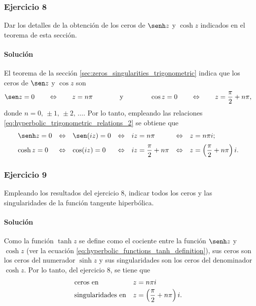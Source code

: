 \documentclass[a4paper]{report}
\begin{document}
\subsubsection{Ejercicio 8}

Dar los detalles de la obtención de los ceros de \(\senh z\) y \(\cosh z\) indicados en el teorema de esta sección.

\paragraph{Solución} El teorema de la sección \ref{sec:zeros_singularities_trigonometric} indica que los ceros de \(\sen z\) y \(\cos z\) son
\[
 \sen z=0\qquad\Leftrightarrow\qquad z=n\pi
 \qquad\qquad\textrm{y}\qquad\qquad
 \cos z=0\qquad\Leftrightarrow\qquad z=\frac{\pi}{2}+n\pi,
\]
donde \(n=0,\,\pm1,\,\pm2,\,\dots\). Por lo tanto, empleando las relaciones \ref{eq:hyperbolic_trigonometric_relations_2} se obtiene que 
\[
 \begin{array}{lllllll}
  \senh z=0 & \Leftrightarrow & \sen(iz)=0 & \Leftrightarrow & iz=n\pi & \Leftrightarrow & z=n\pi i;\\[\medskipamount]
  \cosh z=0 & \Leftrightarrow & \cos(iz)=0 & \Leftrightarrow & iz=\dfrac{\pi}{2}+n\pi & \Leftrightarrow & z=\left(\dfrac{\pi}{2}+n\pi\right)i.
 \end{array}
\]

\subsubsection{Ejercicio 9}

Empleando los resultados del ejercicio 8, indicar todos los ceros y las singularidades de la función tangente hiperbólica.

\paragraph{Solución} Como la función \(\tanh z\) se define como el cociente entre la función \(\senh z\) y \(\cosh z\) (ver la ecuación \ref{eq:hyperbolic_functions_tanh_definition}), sus ceros son los ceros del numerador \(\sinh z\) y sus singularidades son los ceros del denominador \(\cosh z\). Por lo tanto, del ejercicio 8, se tiene que
\[
 \begin{array}{ll}
  \textrm{ceros en} & z=n\pi i\\[\smallskipamount]
  \textrm{singularidades en} & z=\left(\dfrac{\pi}{2}+n\pi\right)i.
 \end{array}
\]
\end{document}
